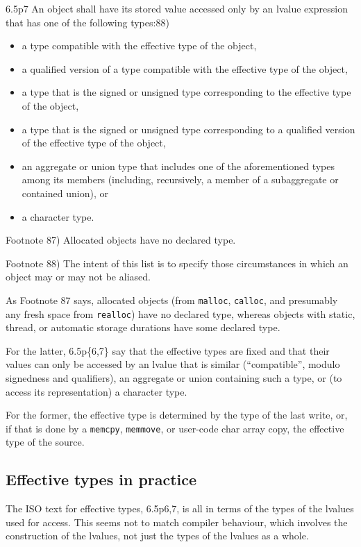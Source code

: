 \documentclass[acmsmall,review,screen]{acmart}\settopmatter{printfolios=true,printccs=false,printacmref=false}
\begin{document}
6.5p7 An object shall have its stored value accessed only by an lvalue
expression that has one of the following types:88)
\begin{itemize}    
  \item  a type compatible with the effective type of the object,
  \item  a qualified version of a type compatible with the effective type
    of the object,
  \item  a type that is the signed or unsigned type corresponding to the
    effective type of the object,
  \item  a type that is the signed or unsigned type corresponding to a
    qualified version of the effective type of the object,
  \item  an aggregate or union type that includes one of the
    aforementioned types among its members (including, recursively, a
    member of a subaggregate or contained union), or
  \item  a character type.
\end{itemize}

\noindent
Footnote 87) Allocated objects have no declared type.

\noindent
Footnote 88) The intent of this list is to specify those circumstances
in which an object may or may not be aliased.

\medskip

As Footnote 87 says, allocated objects (from \lstinline{malloc},
\lstinline{calloc}, and presumably any fresh space from \lstinline{realloc}) have no declared type, whereas
objects with static, thread, or automatic storage durations have some
declared type.  

For the latter, 6.5p\{6,7\} say that the effective
types are fixed and that their values can only be accessed by an
lvalue that is similar (``compatible'', modulo signedness and
qualifiers), an aggregate or union containing such a type, or (to
access its representation) a character type. 

For the former, the effective type is determined by the type of
the last write, or, if that is done by a \lstinline{memcpy},
\lstinline{memmove}, or user-code char array copy, the effective type of
the source. 

\subsection{Effective types in practice}


The ISO text for effective types, 6.5p{6,7}, is all in terms of the
types of the lvalues used for access.   This seems not to match
compiler 
behaviour, which involves the construction of the lvalues, not just
the types of the lvalues as a whole.
\end{document}
